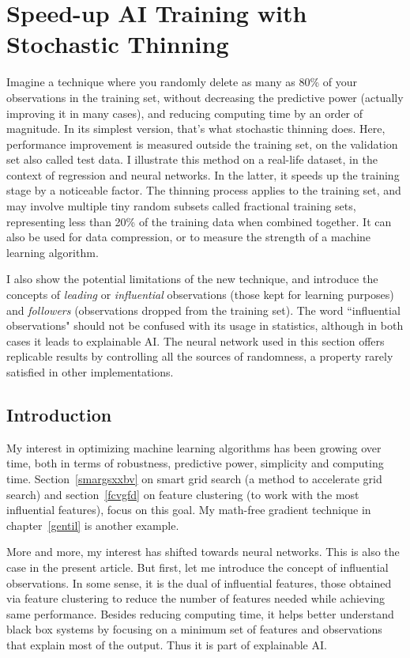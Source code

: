 \documentclass[oneside,10pt]{book}
\begin{document}
\section{Speed-up AI Training with Stochastic Thinning}\label{aithing}

Imagine a technique where you randomly delete as many as 80\% of your 
observations in the training set, without decreasing the predictive power (actually improving it in many cases), and reducing 
 computing time by an order of magnitude. In its simplest version, that's what stochastic thinning does. Here, performance improvement is measured outside the training set, on the validation set also called test data.
I illustrate this method on a real-life dataset, in the context of regression and neural networks. In the latter, 
 it speeds up the training stage by a noticeable factor. The thinning process applies to the training set,  and may involve multiple
 tiny random subsets called fractional training sets, representing less than 20\% of the training data when combined together. It can also be used
 for data compression, or to measure the strength of a machine learning algorithm.


I also show the potential limitations of the new technique, and introduce the concepts of {\em leading} or {\em influential} observations (those kept 
 for learning purposes) and {\em followers} (observations dropped from the training set). The word ``influential observations" should not be confused with its usage in statistics, although in both cases it leads to explainable AI.  The neural network used in this section
 offers replicable results by controlling all the sources of randomness, a property rarely satisfied in other implementations.



\subsection{Introduction}\label{derwas}

My interest in optimizing machine learning algorithms has been growing over time, both in terms of robustness, predictive power, simplicity and computing time. Section~\ref{smargsxxbv} on smart grid search (a method to accelerate grid search) 
 and section~\ref{fcvgfd} on feature clustering (to work with the most influential features), focus on this goal. My math-free gradient technique in chapter~\ref{gentil} is another example. 

More and more, my interest has shifted towards neural networks. This is also the case in the present article. But first, let me introduce the concept of \textcolor{index}{influential observations}. In some sense, it is the dual of 
 \textcolor{index}{influential features}, those obtained via 
 \textcolor{index}{feature clustering} to reduce the number of features needed while achieving same performance. Besides reducing computing time, it helps better understand black box systems by focusing on a minimum set of features and observations that explain most of the output. Thus it is part of \textcolor{index}{explainable AI}. 
\end{document}

